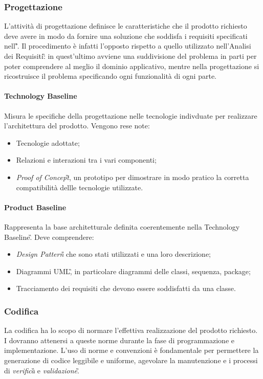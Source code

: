 \subsubsection{Progettazione} 
L'attività di progettazione definisce le caratteristiche che il prodotto richiesto deve avere in modo da fornire una soluzione che soddisfa i requisiti specificati nell'\AdR{}\textit{\G}.
Il procedimento è infatti l'opposto rispetto a quello utilizzato nell'Analisi dei Requisiti\G: in quest'ultimo avviene una suddivisione del problema in parti
per poter comprendere al meglio il dominio applicativo, mentre nella progettazione si ricostruisce il problema specificando ogni funzionalità di ogni parte.

\paragraph{Technology Baseline} \aCapo{}
Misura le specifiche della progettazione nelle tecnologie indivduate per realizzare l'architettura del prodotto. Vengono rese note:
\begin{itemize}
	\item Tecnologie adottate;
	\item Relazioni e interazioni tra i vari componenti;
	\item {\textit{Proof of Concept}\G}, un prototipo per dimostrare in modo pratico la corretta compatibilità  dellle tecnologie utilizzate.
\end{itemize}

\paragraph{Product Baseline} \aCapo{} 
Rappresenta la base architetturale definita coerentemente nella Technology Baseline\G. Deve comprendere:
\begin{itemize}
	\item {\textit{Design Pattern\G{}}} che sono stati utilizzati e una loro descrizione;
	\item Diagrammi UML\G, in particolare diagrammi delle classi, sequenza, package;
	\item Tracciamento dei requisiti che devono essere soddisfatti da una classe.
\end{itemize}





\subsubsection{Codifica} %
La codifica ha lo scopo di normare l'effettiva realizzazione del prodotto richiesto. I \progrs{} dovranno attenersi a queste norme durante la fase di programmazione e implementazione.
L'uso di norme e convenzioni è fondamentale per permettere la generazione di codice leggibile e uniforme, agevolare la manutenzione e i processi di \emph{verifica}\G{} e \emph{validazione}\G.

